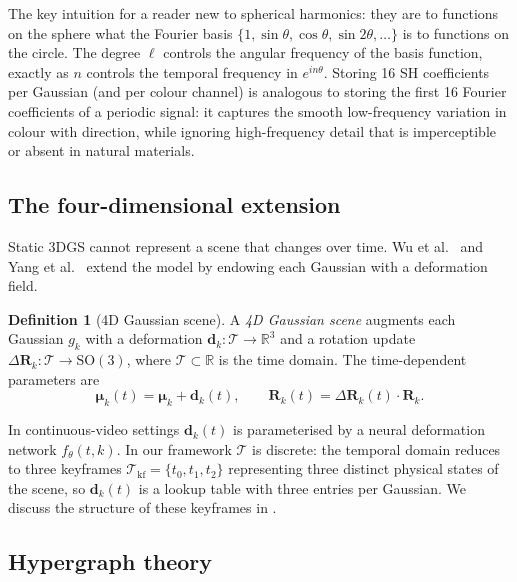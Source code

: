 \documentclass[11pt,a4paper]{article}
\theoremstyle{plain}
\theoremstyle{definition}
\newtheorem{definition}[theorem]{Definition}
\theoremstyle{remark}
\newcommand{\SO}{\mathrm{SO}}
\newcommand{\kf}{\mathcal{T}_{\mathrm{kf}}}
\begin{document}
\begin{insightbox}
The key intuition for a reader new to spherical harmonics: they are
to functions on the sphere what the Fourier basis $\{1, \sin\theta,
\cos\theta, \sin 2\theta, \ldots\}$ is to functions on the circle.
The degree $\ell$ controls the angular frequency of the basis
function, exactly as $n$ controls the temporal frequency in
$e^{in\theta}$. Storing 16 SH coefficients per Gaussian (and per
colour channel) is analogous to storing the first 16 Fourier
coefficients of a periodic signal: it captures the smooth
low-frequency variation in colour with direction, while ignoring
high-frequency detail that is imperceptible or absent in natural
materials.
\end{insightbox}

\subsection{The four-dimensional extension}
\label{sec:prelim_4dgs}

Static 3DGS cannot represent a scene that changes over time. Wu
et al.~\cite{wu2024_4dgs} and Yang et al.~\cite{yang2024deformable}
extend the model by endowing each Gaussian with a deformation field.

\begin{definition}[4D Gaussian scene]
\label{def:4dgs}
A \emph{4D Gaussian scene} augments each Gaussian $g_k$ with a
deformation $\mathbf{d}_k : \mathcal{T} \to \mathbb{R}^3$ and a
rotation update $\Delta\mathbf{R}_k : \mathcal{T} \to \SO(3)$, where
$\mathcal{T} \subset \mathbb{R}$ is the time domain. The
time-dependent parameters are
\[
  {\boldsymbol\mu}_k(t) = {\boldsymbol\mu}_k + \mathbf{d}_k(t),
  \qquad
  \mathbf{R}_k(t) = \Delta\mathbf{R}_k(t) \cdot \mathbf{R}_k.
\]
\end{definition}

In continuous-video settings $\mathbf{d}_k(t)$ is parameterised by a
neural deformation network $f_\theta(t, k)$. In our framework
$\mathcal{T}$ is discrete: the temporal domain reduces to three
keyframes $\kf = \{t_0, t_1, t_2\}$ representing three distinct
physical states of the scene, so $\mathbf{d}_k(t)$ is a lookup table
with three entries per Gaussian. We discuss the structure of these
keyframes in .

\subsection{Hypergraph theory}
\label{sec:prelim_hypergraph}
\end{document}
